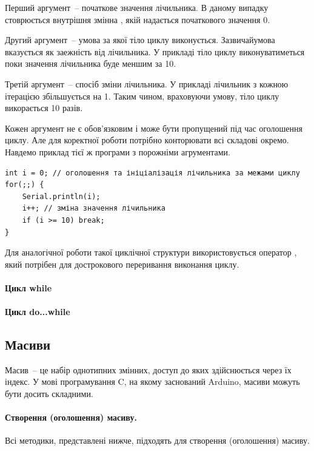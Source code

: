 \documentclass[12pt,a4paper]{report}  %
\begin{document}
Перший аргумент~-- початкове значення лічильника. В даному випадку стоврюється внутрішня змінна , якій надається початкового значення 0.

Другий аргумент~-- умова за якої тіло циклу виконується. Зазвичайумова вказується як заежність від лічильника. У прикладі тіло циклу виконуватиметься поки значення лічильника буде меншим за 10.

Третій аргумент~-- спосіб зміни лічильника. У прикладі лічильник з кожною ітерацією збільшується на 1. Таким чином, враховуючи умову, тіло циклу викорається 10 разів.

Кожен аргумент не є обов'язковим і може бути пропущений під час оголошення циклу. Але для коректної роботи потрібно конторювати всі складові окремо. Навдемо приклад тієї ж програми з порожніми агрументами.

\begin{lstlisting}[label=conditionoperator,caption=Оператор повторення for]
int i = 0; // оголошення та ініціалізація лічильника за межами циклу
for(;;) {
	Serial.println(i);
	i++; // зміна значення лічильника
	if (i >= 10) break;
}
\end{lstlisting}

Для аналогічної роботи такої циклічної структури використовується оператор , який потрібен для дострокового переривання виконання циклу.

\paragraph{Цикл while}
\paragraph{Цикл do...while}

\subsection{Масиви}

Масив~-- це набір однотипних змінних, доступ до яких здійснюється через їх індекс. У мові програмування C, на якому заснований Arduino, масиви можуть бути досить складними.

\paragraph{Створення (оголошення) масиву.} 
Всі методики, представлені нижче, підходять для створення (оголошення) масиву.
\end{document}
